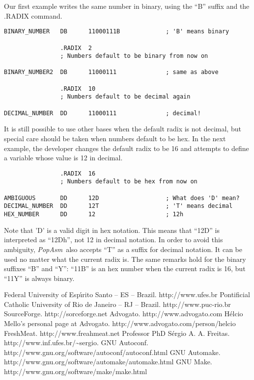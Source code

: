 \documentclass[a4paper,12pt]{book}
\newcommand{\popasm}{\emph{PopAsm}}
\begin{document}
Our first example writes the same number in binary, using the ``B'' suffix
and the .RADIX command.

\begin{verbatim}
BINARY_NUMBER   DB      11000111B             ; 'B' means binary

                .RADIX  2
                ; Numbers default to be binary from now on

BINARY_NUMBER2  DB      11000111              ; same as above

                .RADIX  10
                ; Numbers default to be decimal again

DECIMAL_NUMBER  DD      11000111              ; decimal!
\end{verbatim}

It is still possible to use other bases when the default radix is not
decimal, but special care should be taken when numbers default to be hex.
In the next example, the developer changes the default radix to be 16
and attempts to define a variable whose value is 12 in decimal.

\begin{verbatim}
                .RADIX  16
                ; Numbers default to be hex from now on

AMBIGUOUS       DD      12D                   ; What does 'D' mean?
DECIMAL_NUMBER  DD      12T                   ; 'T' means decimal
HEX_NUMBER      DD      12                    ; 12h
\end{verbatim}

Note that 'D' is a valid digit in hex notation. This means that ``12D''
is interpreted as ``12Dh'', not 12 in decimal notation. In order to
avoid this ambiguity, \popasm\ also accepts ``T'' as a suffix for
decimal notation. It can be used no matter what the current radix is.
The same remarks hold for the binary suffixes ``B'' and ``Y'': ``11B''
is an hex number when the current radix is 16, but ``11Y'' is always
binary.

\begin{thebibliography}{12}
 Federal University of Esp\'{\i}rito Santo -- ES -- Brazil.
http://www.ufes.br
 Pontificial Catholic University of Rio de Janeiro -- RJ
-- Brazil. http://www.puc-rio.br
 SourceForge. http://sorceforge.net
Advogato. http://www.advogato.com
H\'elcio Mello's personal page at Advogato.
http://www.advogato.com/person/helcio
FreshMeat. http://www.freahmeat.net
Professor PhD S\'ergio A. A. Freitas.
http://www.inf.ufes.br/\~{}sergio.
GNU Autoconf.
http://www.gnu.org/software/autoconf/autoconf.html
GNU Automake.
http://www.gnu.org/software/automake/automake.html
GNU Make. http://www.gnu.org/software/make/make.html
\end{thebibliography}
\end{document}
